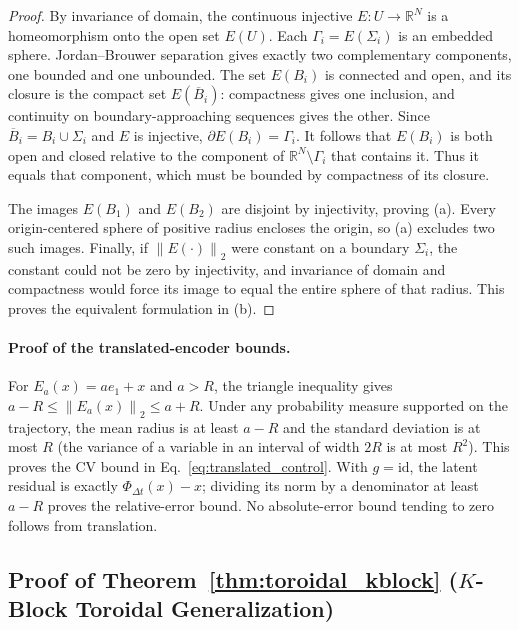 \documentclass[10pt]{article}
\theoremstyle{definition}
\theoremstyle{remark}
\newcommand{\R}{\mathbb{R}}
\newcommand{\norm}[1]{\left\lVert #1 \right\rVert}
\begin{document}
\begin{proof}
By invariance of domain, the continuous injective $E:U\to\R^N$ is a homeomorphism onto the open set $E(U)$. Each $\Gamma_i=E(\Sigma_i)$ is an embedded sphere. Jordan--Brouwer separation gives exactly two complementary components, one bounded and one unbounded. The set $E(B_i)$ is connected and open, and its closure is the compact set $E(\overline B_i)$: compactness gives one inclusion, and continuity on boundary-approaching sequences gives the other. Since $\overline B_i=B_i\cup\Sigma_i$ and $E$ is injective, $\partial E(B_i)=\Gamma_i$. It follows that $E(B_i)$ is both open and closed relative to the component of $\R^N\setminus\Gamma_i$ that contains it. Thus it equals that component, which must be bounded by compactness of its closure.

The images $E(B_1)$ and $E(B_2)$ are disjoint by injectivity, proving (a). Every origin-centered sphere of positive radius encloses the origin, so (a) excludes two such images. Finally, if $\norm{E(\cdot)}_2$ were constant on a boundary $\Sigma_i$, the constant could not be zero by injectivity, and invariance of domain and compactness would force its image to equal the entire sphere of that radius. This proves the equivalent formulation in (b).
\end{proof}

\paragraph{Proof of the translated-encoder bounds.}
For $E_a(x)=ae_1+x$ and $a>R$, the triangle inequality gives $a-R\le\norm{E_a(x)}_2\le a+R$. Under any probability measure supported on the trajectory, the mean radius is at least $a-R$ and the standard deviation is at most $R$ (the variance of a variable in an interval of width $2R$ is at most $R^2$). This proves the CV bound in Eq.~\eqref{eq:translated_control}. With $g=\mathrm{id}$, the latent residual is exactly $\Phi_{\Delta t}(x)-x$; dividing its norm by a denominator at least $a-R$ proves the relative-error bound. No absolute-error bound tending to zero follows from translation.


\subsection{Proof of Theorem~\ref{thm:toroidal_kblock} ($K$-Block Toroidal Generalization)}
\end{document}
